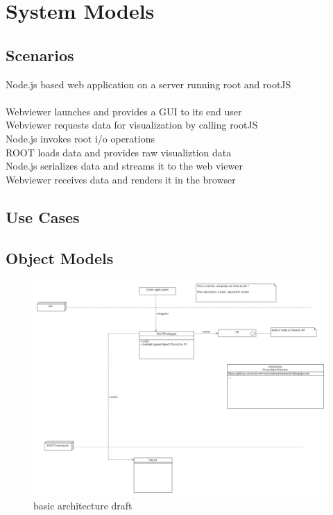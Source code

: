 \chapter{System Models}

\section{Scenarios}
Node.js based web application on a server running root and rootJS\\
\\
Webviewer launches and provides a GUI to its end user	\\
Webviewer requests data for visualization by calling rootJS\\
\indent	Node.js invokes root i/o operations\\
\indent \indent		ROOT loads data and provides raw visualiztion data\\
\indent	Node.js serializes data and streams it to the web viewer\\
Webviewer receives data and renders it in the browser\\
\section{Use Cases}

\pagebreak[4]

\section{Object Models}
\begin{figure}[htb]
	\centering
	\includegraphics[width=18cm]{./latex/resources/architecture.png}
	\caption{basic architecture draft}
\end{figure}

